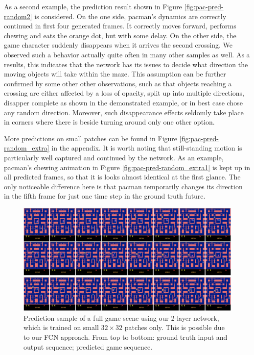 As a second example, the prediction result shown in Figure \ref{fig:pac-pred-random2} is considered. On the one side, pacman's dynamics are correctly continued in first four generated frames. It correctly moves forward, performs chewing and eats the orange dot, but with some delay. On the other side, the game character suddenly disappears when it arrives the second crossing. We observed such a behavior actually quite often in many other samples as well. As a results, this indicates that the network has its issues to decide what direction the moving objects will take within the maze. This assumption can be further confirmed by some other other observations, such as that objects reaching a crossing are either affected by a loss of opacity, split up into multiple directions, disapper complete as shown in the demonstrated example, or in best case chose any random direction. Moreover, such disappearance effects seldomly take place in corners where there is beside turning around only one other option.

More predictions on small patches can be found in Figure \ref{fig:pac-pred-random_extra} in the appendix. It is worth noting that still-standing motion is particularly well captured and continued by the network. As an example, pacman's chewing animation in Figure \ref{fig:pac-pred-random_extra1} is kept up in all predicted frames, so that it is looks almost identical at the first glance. The only noticeable difference here is that pacman temporarily changes its direction in the fifth frame for just one time step in the ground truth future.

\begin{figure}[htpb]
	\centering
	\includegraphics[width=1.0\linewidth]{figures/pred/pac/full/pred-00.png} 
	\caption[Random Full Screen Prediction Sample on MsPacman]{Prediction sample of a full game scene using our 2-layer network, which is trained on small $32 \times 32$ patches only. This is possible due to our FCN approach. From top to bottom: ground truth input and output sequence; predicted game sequence.} \label{fig:pac-pred-full1}
\end{figure}


